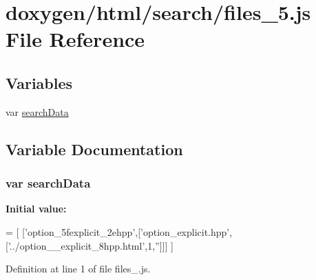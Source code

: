 \hypertarget{a00078}{}\section{doxygen/html/search/files\+\_\+5.js File Reference}
\label{a00078}
\subsection*{Variables}
\begin{DoxyCompactItemize}
\item 
var \hyperlink{a00078_ad01a7523f103d6242ef9b0451861231e}{search\+Data}
\end{DoxyCompactItemize}


\subsection{Variable Documentation}
\hypertarget{a00078_ad01a7523f103d6242ef9b0451861231e}{}
\subsubsection[{search\+Data}]{\setlength{\rightskip}{0pt plus 5cm}var search\+Data}\label{a00078_ad01a7523f103d6242ef9b0451861231e}
{\bfseries Initial value\+:}
\begin{DoxyCode}
=
[
  [\textcolor{stringliteral}{'option\_5fexplicit\_2ehpp'},[\textcolor{stringliteral}{'option\_explicit.hpp'},[\textcolor{stringliteral}{'../option\_\_explicit\_8hpp.html'},1,\textcolor{stringliteral}{''}]]]
]
\end{DoxyCode}


Definition at line 1 of file files\+\_.\+js.

